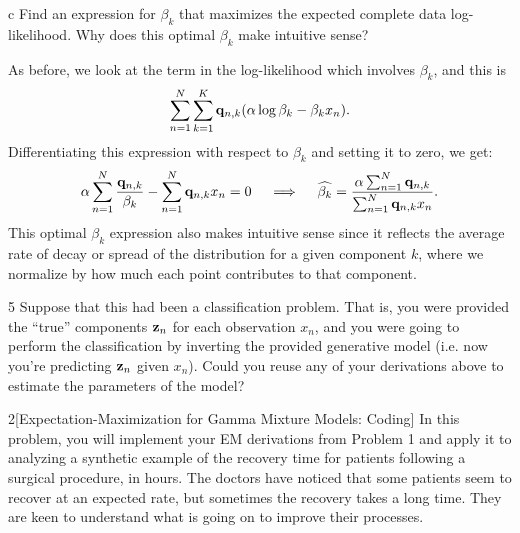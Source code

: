 \documentclass[expanded]{lkx_pset}
\begin{document}
\begin{solution}
\begin{parts}
		\begin{part}{c}
			Find an expression for $\beta_k$ that maximizes the expected complete data log-likelihood.  Why does this optimal $\beta_k$  make intuitive sense?
		\end{part}

		As before, we look at the term in the log-likelihood which involves $\beta_k$, and this is
		\[
			\sum_{n=1}^N \sum^K_{k=1} \mathbf{q}_{n,k} (\alpha\log\beta_k - \beta_k x_n).
		\]
		Differentiating this expression with respect to $\beta_k$ and setting it to zero, we get:
		\[
			\alpha\sum^N_{n=1} \frac{\mathbf{q}_{n,k}}{\beta_k} - \sum^N_{n=1} \mathbf{q}_{n,k} x_n=0\quad\implies \quad \widehat{\beta_k} = \frac{\alpha \sum^N_{n=1}\mathbf{q}_{n,k}}{\sum^N_{n=1}\mathbf{q}_{n,k} x_n}.
		\]
		This optimal $\beta_k$ expression also makes intuitive sense since it reflects the average rate of decay or spread of the distribution for a given component $k$, where we normalize by how much each point contributes to that component.
	\end{parts}

	\begin{part}{5}
		Suppose that this had been a classification problem. That is,
		you were provided the ``true'' components $\mathbf{z}_n$ for each
		observation $x_n$,
		and you were going to perform the classification by
		inverting the provided generative model (i.e. now you're predicting $\mathbf{z}_n$ given $x_n$). Could you reuse any of
		your derivations above to estimate the parameters of the model?
	\end{part}

\end{solution}

\begin{problem}{2}[Expectation-Maximization for Gamma Mixture Models: Coding]
In this problem, you will implement your EM derivations from Problem
1 and apply it to analyzing a synthetic example of the recovery time
for patients following a surgical procedure, in hours.  The doctors
have noticed that some patients seem to recover at an expected rate,
but sometimes the recovery takes a long time.  They are keen to
understand what is going on to improve their processes.
\end{problem}
\end{document}
